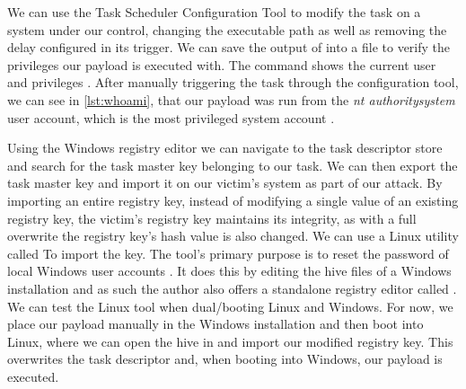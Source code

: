 We can use the Task Scheduler Configuration Tool to modify the  task on a system under our control, changing the executable path as well as removing the delay configured in its trigger.
We can save the output of  into a file to verify the privileges our payload is executed with.
The  command shows the current user and privileges \cite{microsoft-whoami}.
After manually triggering the task through the configuration tool, we can see in \autoref{lst:whoami}, that our payload was run from the \emph{nt authority\brackslash system} user account, which is the most privileged system account \cite{microsoft-localsystem-account}.

\vspace{1em}



Using the Windows registry editor  we can navigate to the task descriptor store and search for the task master key belonging to our task.
We can then export the task master key and import it on our victim's system as part of our attack.
By importing an entire registry key, instead of modifying a single value of an existing registry key, the victim's registry key maintains its integrity, as with a full overwrite the registry key's hash value is also changed.
We can use a Linux utility called  To import the key.
The tool's primary purpose is to reset the password of local Windows user accounts \cite{chntpw}.
It does this by editing the hive files of a Windows installation and as such the author also offers a standalone registry editor called .
We can test the Linux tool when dual\-/booting Linux and Windows.
For now, we place our payload manually in the Windows installation and then boot into Linux, where we can open the  hive in  and import our modified registry key.
This overwrites the task descriptor and, when booting into Windows, our payload is executed.

